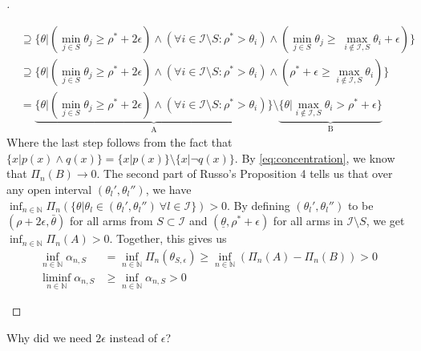 \begin{proof}[]
\begin{itemize}
\begin{align}
    &\supseteq \{\theta |(\min_{j \in S} \theta_j \geq \rho^* + 2 \epsilon) \wedge (\forall i \in \mathcal{I} \setminus S: \rho^* > \theta_i) \wedge (\min_{j \in S} \theta_j \geq\ \max_{i \notin \mathcal{I}, S} \theta_i + \epsilon)\} \\
    &\supseteq \{\theta |(\min_{j \in S} \theta_j \geq \rho^* + 2 \epsilon) \wedge (\forall i \in \mathcal{I} \setminus S: \rho^* > \theta_i) \wedge (\rho^* + \epsilon \geq \max_{i \notin \mathcal{I}, S} \theta_i)\} \\
    &=  \underbrace{\{\theta |(\min_{j \in S} \theta_j \geq \rho^* + 2 \epsilon) \wedge (\forall i \in \mathcal{I} \setminus S: \rho^* > \theta_i) \}}_\text{A} \setminus \underbrace{\{\theta| \max_{i \notin \mathcal{I}, S} \theta_i > \rho^* + \epsilon\}}_\text{B}
  \end{align}
  Where the last step follows from the fact that $\{x|p(x) \wedge q(x)\} = \{x|p(x)\} \setminus \{x|\neg q(x)\}$.
  By \eqref{eq:concentration}, we know that $\Pi_n(B) \rightarrow 0$. The second part of Russo's Proposition 4 tells us that over any open interval $(\theta_l', \theta_l'')$, we have $\inf_{n \in \mathbb{N}} \Pi_n(\{\theta| \theta_l \in (\theta_l', \theta_l'')\ \forall l \in \mathcal{I}\}) > 0$. By defining $(\theta_l', \theta_l'')$ to be $(\rho + 2 \epsilon, \bar{\theta})$ for all arms from $S \subset \mathcal{I}$ and $(\underline{\theta}, \rho^* + \epsilon)$ for all arms in $\mathcal{I} \setminus S$, we get $\inf_{n \in \mathbb{N}} \Pi_n(A) > 0$.
  Together, this gives us
  \begin{align}
    \inf_{n \in \mathbb{N}} \alpha_{n, S} &= \inf_{n \in \mathbb{N}} \Pi_n(\theta_{S, \epsilon}) \geq \inf_{n \in \mathbb{N}}(\Pi_n(A) - \Pi_n(B)) > 0 \\
    \liminf_{n \in \mathbb{N}} \alpha_{n, S} &\geq \inf_{n \in \mathbb{N}} \alpha_{n, S} > 0
  \end{align}
  \end{itemize}
\end{proof}

\begin{remark}[Kevin 19/09/05]
  Why did we need $2\epsilon$ instead of $\epsilon$?
\end{remark}

